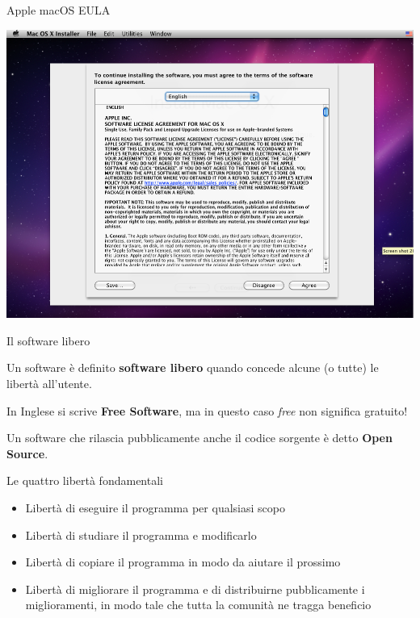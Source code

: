 \documentclass[10pt]{beamer}
\begin{document}
\begin{frame}[fragile]{Apple macOS EULA}

\centering \includegraphics[scale=0.4]{apple_macos_eula}

\end{frame}

\begin{frame}[fragile]{Il software libero}

Un software è definito \textbf{software libero} quando concede alcune (o tutte) le libertà all'utente.

In Inglese si scrive \textbf{Free Software}, ma in questo caso \textit{free} non significa gratuito!

Un software che rilascia pubblicamente anche il codice sorgente è detto \textbf{Open Source}.

\end{frame}

\begin{frame}[fragile]{Le quattro libertà fondamentali}

\begin{itemize}
\item Libertà di eseguire il programma per qualsiasi scopo
\item \pause Libertà di studiare il programma e modificarlo
\item \pause Libertà di copiare il programma in modo da aiutare il prossimo
\item \pause Libertà di migliorare il programma e di distribuirne pubblicamente i miglioramenti, in modo tale che tutta la comunità ne tragga beneficio
\end{itemize}

\end{frame}
\end{document}
